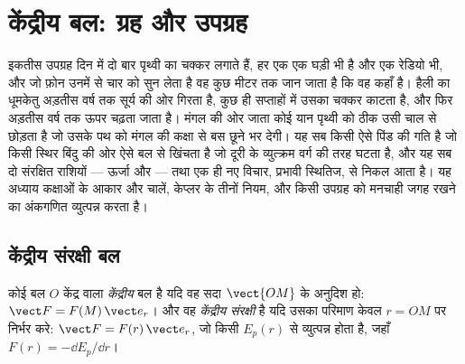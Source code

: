 \chapter{केंद्रीय बल: ग्रह और उपग्रह}\label{ch:b1:central-forces}

इकतीस उपग्रह दिन में दो बार पृथ्वी का चक्कर लगाते हैं, हर एक एक घड़ी भी है
और एक रेडियो भी, और जो फ़ोन उनमें से चार को सुन लेता है वह कुछ मीटर तक जान
जाता है कि वह कहाँ है। हैली का धूमकेतु अड़तीस वर्ष तक सूर्य की ओर गिरता है,
कुछ ही सप्ताहों में उसका चक्कर काटता है, और फिर अड़तीस वर्ष तक ऊपर चढ़ता
जाता है। मंगल की ओर जाता कोई यान पृथ्वी को ठीक उसी चाल से छोड़ता है जो
उसके पथ को मंगल की कक्षा से बस छूने भर देगी। यह सब किसी ऐसे पिंड की गति है
जो किसी स्थिर बिंदु की ओर ऐसे बल से खिंचता है जो दूरी के व्युत्क्रम वर्ग
की तरह घटता है, और यह सब दो संरक्षित राशियों --- ऊर्जा और  ---
तथा एक ही नए विचार, प्रभावी स्थितिज, से निकल आता है। यह अध्याय कक्षाओं के
आकार और चालें, केप्लर के तीनों नियम, और किसी उपग्रह को मनचाही जगह रखने का
अंकगणित व्युत्पन्न करता है।

\section{केंद्रीय संरक्षी बल}

\begin{definition}[केंद्रीय बल; केंद्रीय संरक्षी बल]\label{def:b1:central-forces:central}
कोई बल $O$ केंद्र वाला \emph{केंद्रीय} बल है यदि वह सदा $\vect{OM}$ के
अनुदिश हो: $\vect F = F(M)\,\vect e_r$। और वह \emph{केंद्रीय संरक्षी} है यदि
उसका परिमाण केवल $r = OM$ पर निर्भर करे: $\vect F =
F(r)\,\vect e_r$, जो किसी  $E_p(r)$ से व्युत्पन्न होता है, जहाँ
$F(r) = -\dd E_p/\dd r$।
\end{definition}

